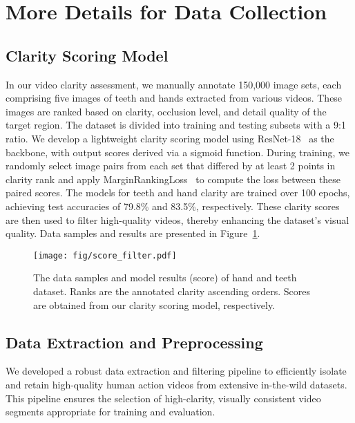 \clearpage
\setcounter{page}{1}
\maketitlesupplementary

\setcounter{figure}{0}
\setcounter{table}{0}
\setcounter{section}{0}
\renewcommand{\thefigure}{A\arabic{figure}}
\renewcommand{\thetable}{A\arabic{table}}
\renewcommand{\thesection}{\Alph{section}}


\section{More Details for Data Collection}
\label{sec:sup_data}

\subsection{Clarity Scoring Model}

In our video clarity assessment, we manually annotate 150,000 image sets, each comprising five images of teeth and hands extracted from various videos. These images are ranked based on clarity, occlusion level, and detail quality of the target region. The dataset is divided into training and testing subsets with a 9:1 ratio. We develop a lightweight clarity scoring model using ResNet-18~\cite{he2016deep} as the backbone, with output scores derived via a sigmoid function. During training, we randomly select image pairs from each set that differed by at least 2 points in clarity rank and apply MarginRankingLoss~\cite{liu2019multi} to compute the loss between these paired scores. The models for teeth and hand clarity are trained over 100 epochs, achieving test accuracies of 79.8\% and 83.5\%, respectively. These clarity scores are then used to filter high-quality videos, thereby enhancing the dataset's visual quality. Data samples and results are presented in Figure~\ref{fig:scoremodel}.
\begin{figure}[htp]
    \centering
    \texttt{[image: fig/score\_filter.pdf]}
    \vspace{-0.25in}
    \caption{The data samples and model results (score) of hand and teeth dataset. Ranks are the annotated clarity ascending orders. Scores are obtained from our clarity scoring model, respectively. }
    \vspace{-0.1in}
    \label{fig:scoremodel}
\end{figure} 

\subsection{Data Extraction and Preprocessing}
We developed a robust data extraction and filtering pipeline to efficiently isolate and retain high-quality human action videos from extensive in-the-wild datasets. This pipeline ensures the selection of high-clarity, visually consistent video segments appropriate for training and evaluation.

